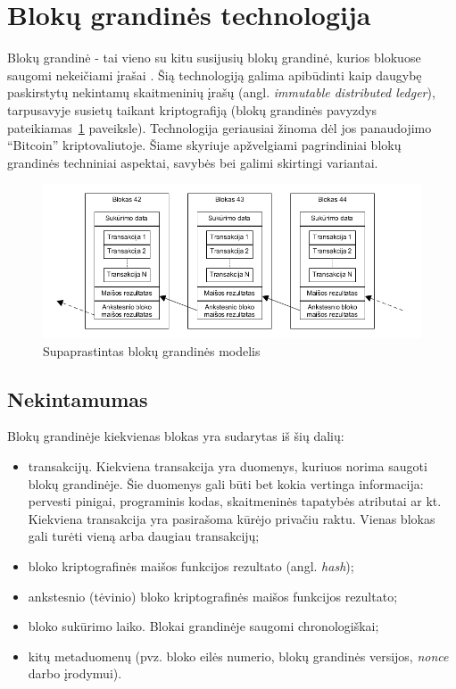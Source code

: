 \section{Blokų grandinės technologija}

Blokų grandinė - tai vieno su kitu susijusių blokų grandinė, kurios blokuose saugomi
nekeičiami įrašai \cite{SatoshiNakamoto}. Šią technologiją galima apibūdinti kaip daugybę paskirstytų nekintamų skaitmeninių įrašų 
(angl. \textit{immutable distributed ledger}), tarpusavyje susietų taikant kriptografiją (blokų grandinės pavyzdys pateikiamas\hypertarget{fig:blockchain}{~\ref{fig:blockchain}} paveiksle). Technologija geriausiai žinoma dėl jos panaudojimo \enquote{Bitcoin} kriptovaliutoje.
Šiame skyriuje apžvelgiami pagrindiniai blokų grandinės techniniai aspektai, savybės bei galimi skirtingi variantai.

\begin{figure}[H]
    \centering
    \includegraphics[scale=0.6]{img/blockchain}
    \caption{Supaprastintas blokų grandinės modelis}
    \label{fig:blockchain}
\end{figure}

\subsection{Nekintamumas}

Blokų grandinėje kiekvienas blokas yra sudarytas iš šių dalių:

\begin{itemize}
    \item transakcijų. Kiekviena transakcija yra duomenys, kuriuos norima saugoti blokų grandinėje. Šie duomenys gali būti bet kokia vertinga informacija:
    pervesti pinigai, programinis kodas, skaitmeninės tapatybės atributai ar kt. Kiekviena transakcija yra pasirašoma
    kūrėjo privačiu raktu. Vienas blokas gali turėti vieną arba daugiau transakcijų;
    \item bloko kriptografinės maišos funkcijos rezultato (angl. \textit{hash});
    \item ankstesnio (tėvinio) bloko kriptografinės maišos funkcijos rezultato;
    \item bloko sukūrimo laiko. Blokai grandinėje saugomi chronologiškai;
    \item kitų metaduomenų (pvz. bloko eilės numerio, blokų grandinės versijos, \textit{nonce} darbo įrodymui).
\end{itemize}

